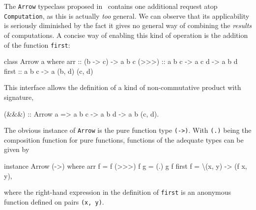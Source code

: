 The \verb|Arrow| typeclass proposed in~\cite{hughes-monad2arr} contains one
additional request atop \linebreak\verb|Computation|, as this is actually
\emph{too} general. We can observe that its applicability is seriously
diminished by the fact it gives no general way of combining the \emph{results}
of computations. A concise way of enabling this kind of operation is the
addition of the function \verb|first|:

\begin{code}
  class Arrow a where
      arr   :: (b -> c) -> a b c
      (>>>) :: a b c -> a c d -> a b d
      first :: a b c -> a (b, d) (c, d)
\end{code}

This interface allows the definition of a kind of non-commutative product with
signature,

\begin{code}
  (&&&) :: Arrow a => a b c -> a b d -> a b (c, d)\textrm{.}
\end{code}

The obvious instance of \verb|Arrow| is the pure function type \verb|(->)|. With
\verb|(.)| being the composition function for pure functions, functions of the
adequate types can be given by

\begin{code}
  instance Arrow (->) where
      arr f     = f
      (>>>) f g = (.) g f
      first f   = \textbackslash(x, y) -> (f x, y)\textrm{,}
\end{code}

where the right-hand expression in the definition of \verb|first| is an
anonymous function defined on pairs \verb|(x, y)|.

